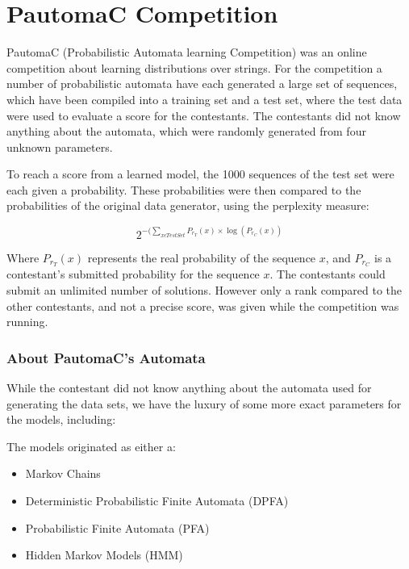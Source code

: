 \section{PautomaC Competition}
\label{sec:pautomac}

PautomaC (Probabilistic Automata learning Competition) was an online competition about learning distributions over strings. For the competition a number of probabilistic automata have each generated a large set of sequences, which have been compiled into a training set and a test set, where the test data were used to evaluate a score for the contestants.
The contestants did not know anything about the automata, which were randomly generated from four unknown parameters.

To reach a score from a learned model, the 1000 sequences of the test set were each given a probability. These probabilities were then compared to the probabilities of the original data generator, using the perplexity measure:

\begin{equation} \label{eq:perplexity}
2^{-(\sum_{x\epsilon TestSet}P_{r_{T}}(x)\times\log(P_{r_{C}}(x))}
\end{equation}

Where $P_{r_{T}}(x)$ represents the real probability of the
sequence $x$, and $P_{r_{C}}$ is a contestant's submitted probability for the sequence $x$.
The contestants could submit an unlimited number of solutions. However only a rank compared to the other contestants, and not a precise score, was given while the competition was running.

\subsubsection{About PautomaC's Automata}
While the contestant did not know anything about the automata used for generating the data sets, we have the luxury of some more exact parameters for the models, including:

The models originated as either a:
\begin{itemize}
\item Markov Chains
\item Deterministic Probabilistic Finite Automata (DPFA)
\item Probabilistic Finite Automata (PFA)
\item Hidden Markov Models (HMM)
\end{itemize}

